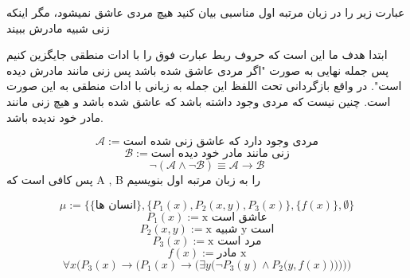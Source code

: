 عبارت زیر را در زبان مرتبه اول مناسبی بیان کنید
هیچ مردی عاشق نمیشود، مگر اینکه زنی شبیه مادرش ببیند
\begin{ans}
	ابتدا هدف ما این است که حروف ربط عبارت فوق را با ادات منطقی جایگزین کنیم پس جمله نهایی به صورت "اگر مردی عاشق شده باشد پس زنی مانند مادرش دیده است". در واقع بازگردانی تحت اللفظ این جمله به زبانی با ادات منطقی به این صورت است. چنین نیست که مردی وجود داشته باشد که عاشق شده باشد و هیچ زنی مانند مادر خود ندیده باشد.
	
		$$
		\mathcal{A} := \text{مردی وجود دارد که عاشق زنی شده است}
		$$
		$$
		\mathcal{B} := \text{زنی مانند مادر خود دیده است}
		$$
		$$
		\neg (\mathcal{A} \wedge \neg \mathcal{B}) \equiv \mathcal{A} \rightarrow {\mathcal{B}}
		$$
		پس کافی است که A , B را به زبان مرتبه اول بنویسیم	
		
		$$
			\mathcal{\mu} := \{\{\text{انسان ها}\}, \{P_1(x), P_2(x, y), P_3(x)\}, \{f(x)\}, \emptyset\}
		$$
		$$
			{P_1}(x) := \text{x عاشق است}
		$$
		$$
			{P_2}(x, y) := \text{x شبیه y است}
		$$
		$$
			{P_3}(x) := \text{x مرد است}
		$$
		$$
			f(x) := \text{مادر x}
		$$
		$$
			\forall x \Big({P_3}(x) \rightarrow \Big({{P_1}(x) \rightarrow \Big({\exists y \Big(\neg {P_3}(y) \wedge {P_2}\Big(y, f(x)\Big)\Big)}}\Big)  \Big)\Big)
		$$
		
	
\end{ans}
